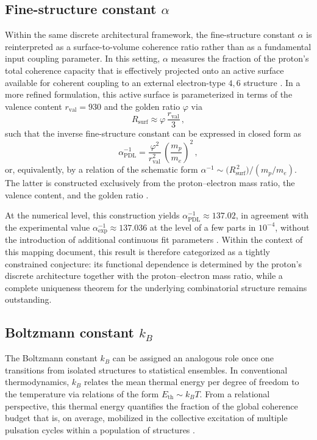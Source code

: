 \documentclass{article}
\begin{document}
\subsection{Fine-structure constant \texorpdfstring{\(\alpha\)}{alpha}}
\label{subsec:alpha}

Within the same discrete architectural framework, the fine-structure constant \(\alpha\) is reinterpreted as a surface-to-volume coherence ratio rather than as a fundamental input coupling parameter. In this setting, \(\alpha\) measures the fraction of the proton’s total coherence capacity that is effectively projected onto an active surface available for coherent coupling to an external electron-type \(4,6\) structure \cite{PDL_intro,PDL_Main_2026}. In a more refined formulation, this active surface is parameterized in terms of the valence content
\(r_{\mathrm{val}} = 930\) and the golden ratio \(\varphi\) via
\[
  R_{\mathrm{surf}} \approx \varphi \,\frac{r_{\mathrm{val}}}{3} \, ,
\]
such that the inverse fine-structure constant can be expressed in closed form as
\[
  \alpha^{-1}_{\mathrm{PDL}} = \frac{\varphi^{2}}{r_{\mathrm{val}}^{2}}\,\left(\frac{m_p}{m_e}\right)^{2} \, ,
\]
or, equivalently, by a relation of the schematic form \(\alpha^{-1} \sim \big(R_{\mathrm{surf}}^{\,2}\big)/(m_p/m_e)\). The latter is constructed exclusively from the proton–electron mass ratio, the valence content, and the golden ratio \cite{Alpha_PDL_v2_2026,Born_Golden_v2_2026}.

At the numerical level, this construction yields \(\alpha^{-1}_{\mathrm{PDL}} \approx 137.02\), in agreement with the experimental value \(\alpha^{-1}_{\mathrm{exp}} \approx 137.036\) at the level of a few parts in \(10^{-4}\), without the introduction of additional continuous fit parameters \cite{Alpha_PDL_v2_2026,PDL_intro}. Within the context of this mapping document, this result is therefore categorized as a tightly constrained conjecture: its functional dependence is determined by the proton’s discrete architecture together with the proton–electron mass ratio, while a complete uniqueness theorem for the underlying combinatorial structure remains outstanding.

\subsection{Boltzmann constant \texorpdfstring{\(k_B\)}{kB}}
\label{subsec:kB}

The Boltzmann constant \(k_B\) can be assigned an analogous role once one transitions from isolated structures to statistical ensembles. In conventional thermodynamics, \(k_B\) relates the mean thermal energy per degree of freedom to the temperature via relations of the form \(E_{\mathrm{th}} \sim k_B T\). From a relational perspective, this thermal energy quantifies the fraction of the global coherence budget that is, on average, mobilized in the collective excitation of multiple pulsation cycles within a population of structures
\cite{PDL_Main_2026,PDL_position}.
\end{document}
